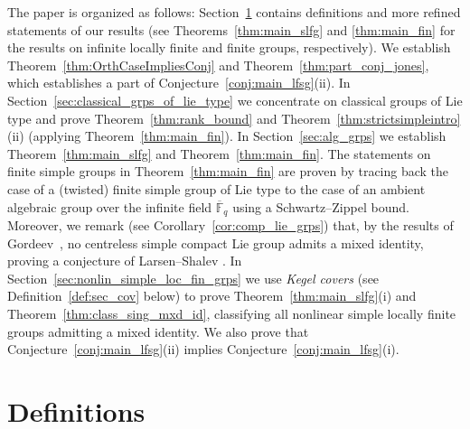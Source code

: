 \documentclass[a4paper,12pt]{amsproc}
\theoremstyle{plain}
\theoremstyle{definition}
\begin{document}
The paper is organized as follows: Section~\ref{sec:def} contains definitions and more refined statements of our results (see Theorems~\ref{thm:main_slfg} and \ref{thm:main_fin} 
for the results on infinite locally finite and finite groups, respectively). We establish Theorem~\ref{thm:OrthCaseImpliesConj} and Theorem~\ref{thm:part_conj_jones}, 
which establishes a part of Conjecture~\ref{conj:main_lfsg}(ii). In Section~\ref{sec:classical_grps_of_lie_type} we concentrate on classical groups of Lie type and prove Theorem~\ref{thm:rank_bound} and Theorem~\ref{thm:strictsimpleintro}(ii) (applying Theorem~\ref{thm:main_fin}).  In Section~\ref{sec:alg_grps} we establish Theorem~\ref{thm:main_slfg} and Theorem~\ref{thm:main_fin}. The statements on finite simple groups in Theorem~\ref{thm:main_fin} are proven by tracing back the case of a (twisted) finite simple group of Lie type to the case of an ambient algebraic group over the infinite field $\overline{\mathbb{F}}_q$ using a Schwartz--Zippel bound. Moreover, we remark (see Corollary~\ref{cor:comp_lie_grps}) that, by the results of Gordeev~\cite{gordeev1997freedom}, no centreless simple compact Lie group admits a mixed identity, proving a conjecture of Larsen--Shalev \cite{larsenshalev2022identities}.
In Section~\ref{sec:nonlin_simple_loc_fin_grps} we use \emph{Kegel covers} (see Definition~\ref{def:sec_cov} below) to prove Theorem~\ref{thm:main_slfg}(i) and Theorem~\ref{thm:class_sing_mxd_id}, classifying all nonlinear simple locally finite groups admitting a mixed identity. We also prove that Conjecture~\ref{conj:main_lfsg}(ii) implies Conjecture~\ref{conj:main_lfsg}(i).

\section{Definitions}\label{sec:def}
\end{document}

